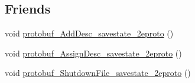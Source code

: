 \subsection*{Friends}
\begin{DoxyCompactItemize}
\item 
void \hyperlink{class_save_state___timeout_info_a6c158c382b70217710599263699c97b8}{protobuf\-\_\-\-Add\-Desc\-\_\-savestate\-\_\-2eproto} ()
\item 
void \hyperlink{class_save_state___timeout_info_ad76d2b61ce7efa59b3fa8cc9a2e22804}{protobuf\-\_\-\-Assign\-Desc\-\_\-savestate\-\_\-2eproto} ()
\item 
void \hyperlink{class_save_state___timeout_info_a1ecf56abe5c72689d00559c47c8e69f7}{protobuf\-\_\-\-Shutdown\-File\-\_\-savestate\-\_\-2eproto} ()
\end{DoxyCompactItemize}


